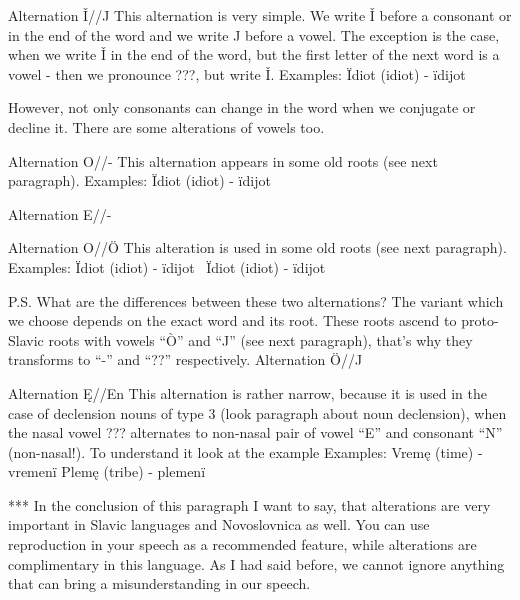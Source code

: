  
Alternation Ǐ//J
This alternation is very simple. We write Ǐ before a consonant or in the end of the word and we write J before a vowel. The exception is the case, when we write Ǐ in the end of the word, but the first letter of the next word is a vowel - then we pronounce ???, but write Ǐ.
Examples:
Ïdiot (idiot) \textipa{[id1’ot]} - ïdijot \textipa{[id1’Jot]}


However, not only consonants can change in the word when we conjugate or decline it. There are some alterations of vowels too.

Alternation O//-
This alternation appears in some old roots (see next paragraph).
Examples:
Ïdiot (idiot) \textipa{[id1’ot]} - ïdijot \textipa{[id1’Jot]}




Alternation E//-



Alternation O//Ö
This alteration is used in some old roots (see next paragraph).
Examples:
Ïdiot (idiot) \textipa{[id1’ot]} - ïdijot \textipa{[id1’Jot]}\
Ïdiot (idiot) \textipa{[id1’ot]} - ïdijot \textipa{[id1’Jot]}

P.S. What are the differences between these two alternations? The variant which we choose depends on the exact word and its root. These roots ascend to proto-Slavic roots with vowels “Ò” and “J” (see next paragraph), that’s why they transforms to “-” and “??” respectively.
Alternation Ö//J



Alternation Ę//En
This alternation is rather narrow, because it is used in the case of declension nouns of type 3 (look paragraph about noun declension), when the nasal vowel ??? alternates to non-nasal pair of vowel “E” and consonant “N” (non-nasal!). To understand it look at the example
Examples:
Vremę (time) \textipa{[‘vrEmj\~E]} - vremenï 
Plemę (tribe) \textipa{[‘plEmj\~E]} - plemenï \textipa{[‘plEmE\textltailn i]}

***
In the conclusion of this paragraph I want to say, that alterations are very important in Slavic languages and Novoslovnica as well. You can use reproduction in your speech as a recommended feature, while alterations are complimentary in this language. As I had said before, we cannot ignore anything that can bring a misunderstanding in our speech. 
